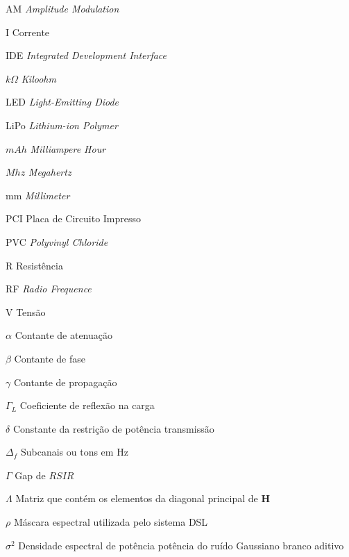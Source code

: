 \documentclass[
	12pt,				%
	openright,			%
	oneside,			%
	a4paper,			%
	english,			%
	brazil				%
	]{abntex2}
\begin{document}
\begin{siglas}

	\item[AM]\textit{Amplitude Modulation}
	\item[I]Corrente
	\item[IDE]\textit{Integrated Development Interface}
	\item[$k\Omega$]\textit{Kiloohm}
	\item[LED]\textit{Light-Emitting Diode}
	\item[LiPo]\textit{Lithium-ion Polymer}
	\item[$mAh$]\textit{Milliampere Hour}
	\item[$Mhz$]\textit{Megahertz}
	\item[mm]\textit{Millimeter}
	\item[PCI]Placa de Circuito Impresso
	\item[PVC]\textit{Polyvinyl Chloride}	
	\item[R]Resistência
	\item[RF]\textit{Radio Frequence}
	\item[V]Tensão	
	
\end{siglas}

\begin{simbolos}
  \item[$\alpha$] Contante de atenuação
  \item[$\beta$] Contante de fase
  \item[$\gamma$] Contante de propagação
  \item[$\Gamma_{L}$] Coeficiente de reflexão na carga
  \item[$\delta$] Constante da restrição de potência transmissão
  \item[$\Delta_f$ ] Subcanais ou tons em Hz
  \item[$ \Gamma $]  Gap de $RSIR$
  \item[$ \Lambda $] Matriz que contém os elementos da diagonal principal de $\mathbf{H}$
  \item[$\rho$] Máscara espectral utilizada pelo sistema DSL
  \item[${\sigma}^{2}$]  Densidade espectral de potência potência do ruído Gaussiano branco aditivo
\end{simbolos}

\tableofcontents*
\cleardoublepage
\end{document}
